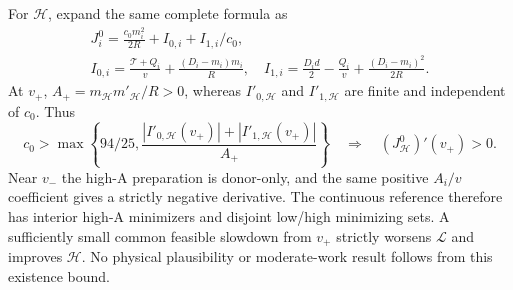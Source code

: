 \documentclass[11pt,a4paper]{article}
\begin{document}
For $\mathcal H$, expand the same complete formula as
\begin{equation}
 \begin{gathered}
 J_i^0=\frac{c_0m_i^2}{2R}+I_{0,i}+I_{1,i}/c_0,\\
 I_{0,i}=\frac{\mathcal T+Q_i}{v}+\frac{(D_i-m_i)m_i}{R},\quad
 I_{1,i}=\frac{D_id}{2}-\frac{Q_i}{v}+\frac{(D_i-m_i)^2}{2R}.
 \end{gathered}\label{eq:expansion}
\end{equation}
At $v_+$, $A_+=m_{\mathcal H}m'_{\mathcal H}/R>0$, whereas
$I'_{0,\mathcal H}$ and $I'_{1,\mathcal H}$ are finite and independent of
$c_0$. Thus
\begin{equation}
 c_0>\max\left\{94/25,
 \frac{|I'_{0,\mathcal H}(v_+)|+|I'_{1,\mathcal H}(v_+)|}{A_+}\right\}
 \quad\Longrightarrow\quad (J_{\mathcal H}^0)'(v_+)>0.
 \label{eq:positivecost}
\end{equation}
Near $v_-$ the high-A preparation is donor-only, and the same positive
$A_i/v$ coefficient gives a strictly negative derivative. The continuous
reference therefore has interior high-A minimizers and disjoint low/high
minimizing sets. A sufficiently small common feasible slowdown from $v_+$
strictly worsens $\mathcal L$ and improves $\mathcal H$. No physical
plausibility or moderate-work result follows from this existence bound.
\end{document}
